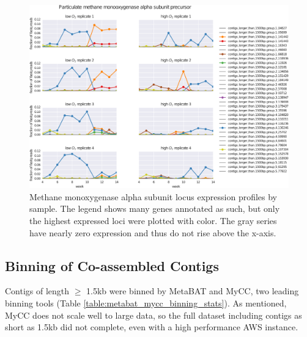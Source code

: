 \begin{figure}[H]
\centering
    \includegraphics[width=1.0\textwidth]{./tex/chapter2/figures/170328_loci_read_fracs_Particulate_methane_monooxygenase_alpha_subunit_precursor--portrait--cleaned.pdf}
    \begin{singlespace}
    \caption[Methane monoxygenase alpha subunit locus expression profiles by sample]{
        Methane monoxygenase alpha subunit locus expression profiles by sample.
        The legend shows many genes annotated as such, but only the highest expressed loci were plotted with color.
        The gray series have nearly zero expression and thus do not rise above the x-axis.
        }
    \label{fig:mmo_alpha}
    \end{singlespace}
\end{figure}

\subsection{Binning of Co-assembled Contigs}    %

Contigs of length $\geq$ 1.5kb were binned by MetaBAT and MyCC, two leading binning tools (Table \ref{table:metabat_mycc_binning_stats}).
As mentioned, MyCC does not scale well to large data, so the full dataset including contigs as short as 1.5kb did not complete, even with a high performance AWS instance.


